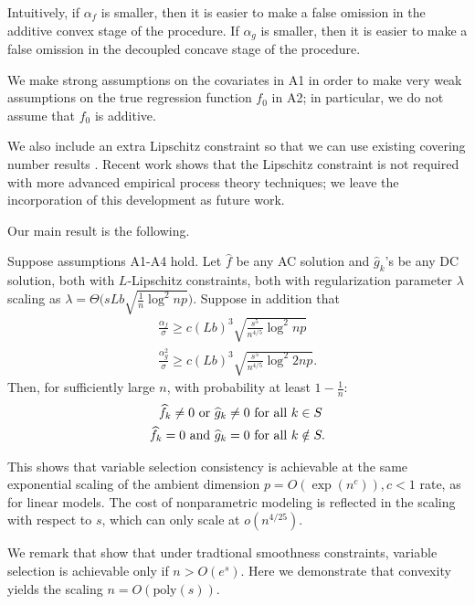 Intuitively, if $\alpha_f$ is smaller, then it is easier to make a
false omission in the additive convex stage of the procedure. If
$\alpha_g$ is smaller, then it is easier to make a false omission in
the decoupled concave stage of the procedure.

We make strong assumptions on the covariates in A1 in order to make
very weak assumptions on the true regression function $f_0$ in
A2; in particular, we do not assume that $f_0$ is additive. 

We also include an extra
Lipschitz constraint so that we can use existing covering number
results \cite{Bronshtein:76}. Recent work
\cite{Guntu:13} shows that the Lipschitz constraint
is not required with more advanced empirical process theory
techniques; we leave the incorporation of this development as future work. 

Our main result is the following.
\begin{theorem}
Suppose assumptions A1-A4 hold. Let $\hat{f}$ be any AC solution and
$\hat{g}_k$'s be any DC solution, both with $L$-Lipschitz constraints,
both with  regularization parameter $\lambda$ scaling as
$\lambda = \Theta \Big( sLb \sqrt{\frac{1}{n} \log^2 np} \Big)$. 
Suppose in addition that
\begin{gather}
\frac{\alpha_f}{\sigma} \geq c (Lb)^3 \sqrt{\frac{s^5}{n^{4/5}} \log^2
  np}\\
\frac{\alpha_g^2}{\sigma} \geq c (Lb)^3 \sqrt{\frac{s^5}{n^{4/5}}
  \log^2 2np}.
\end{gather}
Then, for sufficiently large $n$, with probability at least $1-\frac{1}{n}$:
\begin{align*}
\widehat{f}_k \neq 0 \textrm{ or } \widehat{g}_k \neq 0 &\textrm{ for all } k \in S\\
\widehat{f}_k = 0 \textrm{ and } \widehat{g}_k = 0 & \textrm{ for all } k \notin S.
\end{align*}

\end{theorem}

This shows that variable selection consistency is achievable at the
same exponential scaling of the ambient dimension $p = O(\exp(n^c)),
c<1$ rate,  as for linear models. The cost of nonparametric modeling is
reflected in the scaling with respect to $s$, which can only scale at
$o(n^{4/25})$.

We remark that \citet{dalalyan:12} show that under tradtional smoothness
constraints, variable selection is achievable only if $n > O(e^s)$. 
Here we demonstrate that convexity yields the scaling $n =
O(\textrm{poly}(s))$.


